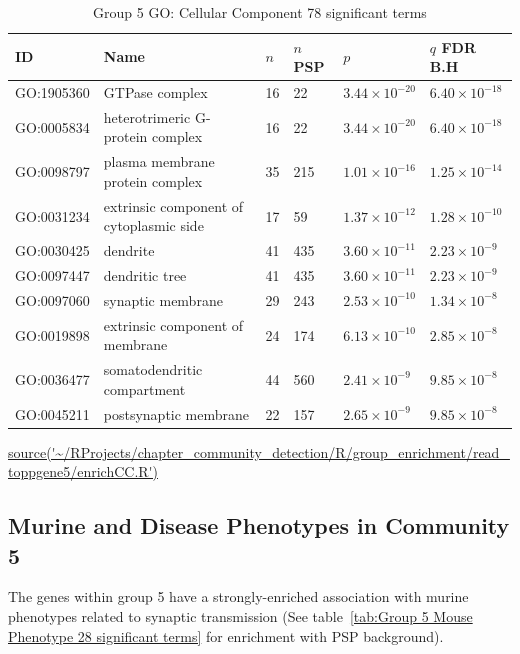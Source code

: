 \begin{table}[ht]
\centering
\setlength{\extrarowheight}{2pt}
\begin{adjustbox}{width=\textwidth}
\begin{tabular}{llllll}
  \toprule
ID & Name &$n$ &$n$ PSP& $p$ & $q$ FDR B.H \\ 
  \midrule
GO:1905360 & GTPase complex & 16 & 22 & $3.44 \times 10^{-20}$ & $6.40 \times 10^{-18}$ \\ 
  GO:0005834 & heterotrimeric G-protein complex & 16 & 22 & $3.44 \times 10^{-20}$ & $6.40 \times 10^{-18}$ \\ 
  GO:0098797 & plasma membrane protein complex & 35 & 215 & $1.01 \times 10^{-16}$ & $1.25 \times 10^{-14}$ \\ 
  GO:0031234 & extrinsic component of cytoplasmic side  & 17 & 59 & $1.37 \times 10^{-12}$ & $1.28 \times 10^{-10}$ \\ 
  GO:0030425 & dendrite & 41 & 435 & $3.60 \times 10^{-11}$ & $2.23 \times 10^{-9}$ \\ 
  GO:0097447 & dendritic tree & 41 & 435 & $3.60 \times 10^{-11}$ & $2.23 \times 10^{-9}$ \\ 
  GO:0097060 & synaptic membrane & 29 & 243 & $2.53 \times 10^{-10}$ & $1.34 \times 10^{-8}$ \\ 
  GO:0019898 & extrinsic component of membrane & 24 & 174 & $6.13 \times 10^{-10}$ & $2.85 \times 10^{-8}$ \\ 
  GO:0036477 & somatodendritic compartment & 44 & 560 & $2.41 \times 10^{-9}$ & $9.85 \times 10^{-8}$ \\ 
  GO:0045211 & postsynaptic membrane & 22 & 157 & $2.65 \times 10^{-9}$ & $9.85 \times 10^{-8}$ \\ 
   \bottomrule
\end{tabular}
\end{adjustbox}
\caption{Group 5 GO: Cellular Component 78 significant terms} 
\tiny\url{source('~/RProjects/chapter_community_detection/R/group_enrichment/read_toppgene5/enrichCC.R')}
\label{tab:Group 5 GO: Cellular Component 78 significant terms}
\end{table}

    
\subsection{Murine and Disease Phenotypes in Community 5}
The genes within group 5 have a strongly-enriched association with murine phenotypes related to synaptic transmission (See table~\ref{tab:Group 5 Mouse Phenotype 28 significant terms} for enrichment with PSP background). 

